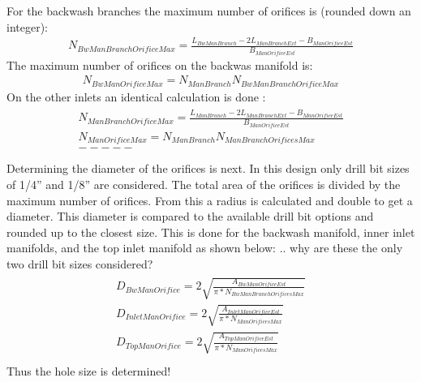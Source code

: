 \documentclass[letterpaper,10pt,english]{sphinxmanual}
\begin{document}
For the backwash branches the maximum number of orifices is (rounded down an integer):
\begin{equation}\label{equation:Filtration/Filtration_Derivations:Filtration/Filtration_Derivations:49}
\begin{split}N_{BwManBranchOrificeMax} = \frac{L_{BwManBranch} - 2L_{ManBranchExt} - B_{ManOrificeEst}}{B_{ManOrificeEst}}\end{split}
\end{equation}
The maximum number of orifices on the backwas manifold is:
\begin{equation}\label{equation:Filtration/Filtration_Derivations:Filtration/Filtration_Derivations:50}
\begin{split}N_{BwManOrificeMax} = N_{ManBranch} N_{BwManBranchOrificeMax}\end{split}
\end{equation}
On the other inlets an identical calculation is done :
\begin{align}\label{equation:Filtration/Filtration_Derivations:Filtration/Filtration_Derivations:51}\!\begin{aligned}
N_{ManBranchOrificeMax} = \frac{L_{ManBranch} - 2L_{ManBranchExt} - B_{ManOrificeEst}}{B_{ManOrificeEst}}\\
N_{ManOrificeMax} = N_{ManBranch} N_{ManBranchOrificesMax}\\
-----\\
\end{aligned}\end{align}
Determining the diameter of the orifices is next.
In this design only drill bit sizes of 1/4” and 1/8” are considered. The total area of the orifices is divided by the maximum number of orifices. From this a radius is calculated and double to get a diameter. This diameter is compared to the available  drill bit options and rounded up to the closest size. This is done for the backwash manifold, inner inlet manifolds, and the top inlet manifold as shown below:
.. why are these the only two drill bit sizes considered?
\begin{align}\label{equation:Filtration/Filtration_Derivations:Filtration/Filtration_Derivations:52}\!\begin{aligned}
D_{BwManOrifice} = 2\sqrt{\frac{A_{BwManOrificeEst}}{\pi* N_{BwManBranchOrificesMax}}}\\
D_{InletManOrifice} = 2\sqrt{\frac{A_{InletManOrificeEst}}{\pi* N_{ManOrificesMax}}}\\
D_{TopManOrifice} = 2\sqrt{\frac{A_{TopManOrificeEst}}{\pi* N_{ManOrificesMax}}}\\
\end{aligned}\end{align}
Thus the hole size is determined!
\end{document}
